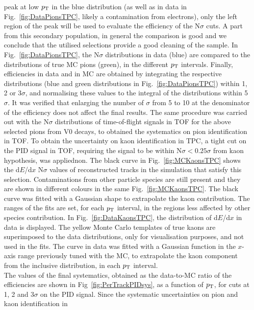 peak at low $p_{\rm T}$ in
the blue distribution (as well as in data in Fig.~\ref{fig:DataPionsTPC}, likely a contamination from electrons), 
only the left region of the peak will be used 
to evaluate the efficiency of the N$\sigma$ cuts.
A part from this secondary population, in general the comparison is good and we
conclude that the utilised selections provide a good
cleaning of the sample. 
In Fig.~\ref{fig:DataPionsTPC}, the N$\sigma$ distributions in data (blue) are compared
to the distributions of true MC pions (green), in the different $p_{\rm T}$ intervals.  
Finally, efficiencies in data and in MC are obtained by integrating the respective 
distributions (blue and green distributions in Fig.~\ref{fig:DataPionsTPC})
within 1, 2 or 3$\sigma$, and normalising these values to the integral 
of the distributions within 5$\sigma$. It was verified that enlarging the number of $\sigma$ from 5 to 10 at the 
denominator of the efficiency does not affect the final results.
The same procedure
was carried out with the N$\sigma$ distributions of time-of-flight signals in TOF
for the above selected pions from V0 decays, to obtained the systematics on pion identification in TOF.
To obtain the uncertainty on kaon identification in TPC, a tight cut on the PID 
signal in TOF, requiring the signal to be within N$\sigma < 0.25\sigma$ from kaon hypothesis, was appliednon. 
The black curve in Fig.~\ref{fig:MCKaonsTPC} shows the d$E$/d$x$ 
N$\sigma$ values of reconstructed tracks in the simulation that satisfy this selection.
Contaminations from other particle species are still present and they
are shown in different colours in the same Fig.~\ref{fig:MCKaonsTPC}. 
The black curve was fitted with a Gaussian shape 
to extrapolate the kaon contribution. The ranges of the fits are set, for each $p_{\rm T}$ interval, in 
the regions less affected by other species contribution.
In Fig.~\ref{fig:DataKaonsTPC}, the distribution of d$E$/d$x$ in data is displayed. 
The yellow Monte Carlo templates of true 
kaons are superimposed to the data distributions, 
only for visualisation purposes, and not used in the fits. The curve in data
was fitted with a Gaussian function in the $x$-axis range previously tuned with the MC,
to extrapolate the kaon component from the inclusive distribution, in each $p_{\rm T}$ interval.\\
The values of the final systematics, obtained as the data-to-MC ratio
of the efficiencies are shown in Fig~\ref{fig:PerTrackPIDsys}, as a function of $p_{\rm T}$,
for cuts at 1, 2 and 3$\sigma$ on the PID signal. 
Since the systematic uncertainties on pion and kaon identification in 

